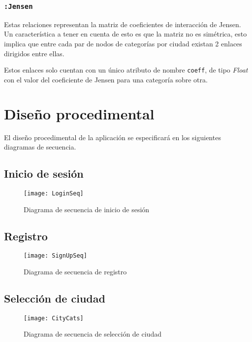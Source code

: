 \subsubsection{\texttt{:Jensen}}
Estas relaciones representan la matriz de coeficientes de interacción de Jensen. Un característica a tener en cuenta de esto es que la matriz no es simétrica, esto implica que entre cada par de nodos de categorías por ciudad existan 2 enlaces dirigidos entre ellas.

Estos enlaces solo cuentan con un único atributo de nombre \texttt{coeff}, de tipo \textit{Float} con el valor del coeficiente de Jensen para una categoría sobre otra.

\section{Diseño procedimental}
El diseño procedimental de la aplicación se especificará en los siguientes diagramas de secuencia.
\newpage
\subsection{Inicio de sesión}
\begin{figure}[!h]
	\centering
	\texttt{[image: LoginSeq]}
	\caption{Diagrama de secuencia de inicio de sesión}\label{LoginSeq}
\end{figure}
\FloatBarrier

\newpage

\subsection{Registro}

	\begin{figure}[!h]
		\centering
		\texttt{[image: SignUpSeq]}
		\caption{Diagrama de secuencia de registro}\label{SignUpSeq}
	\end{figure}
	\FloatBarrier

\newpage



\begin{landscape}
	\subsection{Selección de ciudad}
	\begin{figure}[!h]
		\centering
		\texttt{[image: CityCats]}
		\caption{Diagrama de secuencia de selección de ciudad}\label{CityCats}
	\end{figure}
	\FloatBarrier
\end{landscape}

